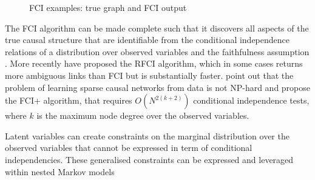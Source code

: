 \documentclass[11pt,a4paper,oneside]{book}
\theoremstyle{plain}
\theoremstyle{definition}
\begin{document}
\begin{figure}
\begin{subfigure}[t]{0.4\textwidth}
\end{subfigure}
\caption{FCI examples: true graph and FCI output}
\label{fig:FCIExamples}
\end{figure} 

The FCI algorithm can be made complete such that it discovers all aspects of the true causal structure that are identifiable from the conditional independence relations of a distribution over observed variables and the faithfulness assumption \citep{Zhang2008}. More recently \citet{Colombo2012} have proposed the RFCI algorithm, which in some cases returns more ambiguous links than FCI but is substantially faster. \citet{Claassen2013} point out that the problem of learning sparse causal networks from data is not NP-hard and propose the FCI+ algorithm, that requires $O(N^{2(k+2)})$ conditional independence tests, where $k$ is the maximum node degree over the observed variables. 

Latent variables can create constraints on the marginal distribution over the observed variables that cannot be expressed in term of conditional independencies. These generalised constraints can be expressed and leveraged within nested Markov models \citep{Richardson2012,Shipster2014} 


\end{document}
